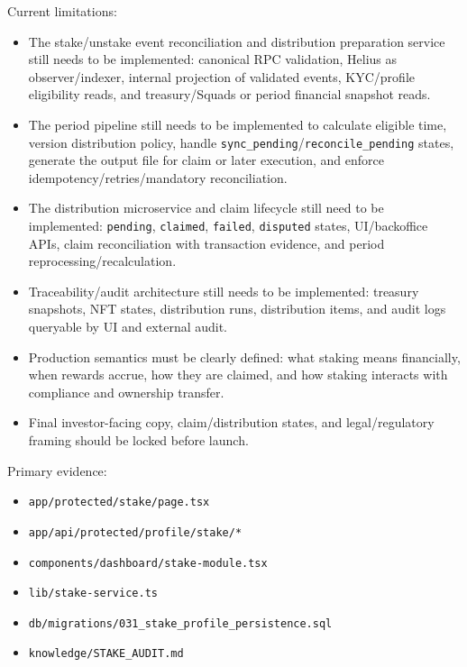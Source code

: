 \documentclass[
  10pt,
  letterpaper,
]{article}
\providecommand{\tightlist}{%
  \setlength{\itemsep}{0pt}\setlength{\parskip}{0pt}}
\let\oldtexttt\texttt
\renewcommand{\texttt}[1]{\oldtexttt{\small #1}}
\begin{document}
Current limitations:

\begin{itemize}
\tightlist
\item
  The stake/unstake event reconciliation and distribution preparation
  service still needs to be implemented: canonical RPC validation,
  Helius as observer/indexer, internal projection of validated events,
  KYC/profile eligibility reads, and treasury/Squads or period financial
  snapshot reads.
\item
  The period pipeline still needs to be implemented to calculate
  eligible time, version distribution policy, handle
  \texttt{sync\_pending}/\texttt{reconcile\_pending} states, generate
  the output file for claim or later execution, and enforce
  idempotency/retries/mandatory reconciliation.
\item
  The distribution microservice and claim lifecycle still need to be
  implemented: \texttt{pending}, \texttt{claimed}, \texttt{failed},
  \texttt{disputed} states, UI/backoffice APIs, claim reconciliation
  with transaction evidence, and period reprocessing/recalculation.
\item
  Traceability/audit architecture still needs to be implemented:
  treasury snapshots, NFT states, distribution runs, distribution items,
  and audit logs queryable by UI and external audit.
\item
  Production semantics must be clearly defined: what staking means
  financially, when rewards accrue, how they are claimed, and how
  staking interacts with compliance and ownership transfer.
\item
  Final investor-facing copy, claim/distribution states, and
  legal/regulatory framing should be locked before launch.
\end{itemize}

Primary evidence:

\begin{itemize}
\tightlist
\item
  \texttt{app/protected/stake/page.tsx}
\item
  \texttt{app/api/protected/profile/stake/*}
\item
  \texttt{components/dashboard/stake-module.tsx}
\item
  \texttt{lib/stake-service.ts}
\item
  \texttt{db/migrations/031\_stake\_profile\_persistence.sql}
\item
  \texttt{knowledge/STAKE\_AUDIT.md}
\end{itemize}
\end{document}
